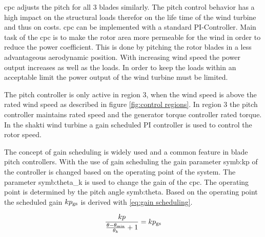 \gls{cpc} adjusts the pitch for all 3 blades similarly.
The pitch control behavior has a high impact on the structural loads therefor on the life time of the wind turbine and thus on costs.
\gls{cpc} can be implemented with a standard PI-Controller.
Main task of the \gls{cpc} is to make the rotor area more permeable for the wind in order to reduce the power coefficient.
This is done by pitching the rotor blades in a less advantageous aerodynamic position.
With increasing wind speed the power output increases as well as the loads.
In order to keep the loads within an acceptable limit the power output of the wind turbine must be limited.

The pitch controller is only active in region 3, when the wind speed is above the rated wind speed as described in figure \ref{fig:control regions}.
In region 3 the pitch controller maintains rated speed and the generator torque controller rated torque. \cite{SchlipfLecture}
In the \gls{shakti} wind turbine a gain scheduled PI controller is used to control the rotor speed. 

The concept of gain scheduling is widely used and a common feature in blade pitch controllers.
With the use of gain scheduling the gain parameter \gls{symb:kp} of the controller is changed based on the operating point of the system.
The parameter \gls{symb:theta_k} is used to change the gain of the \gls{cpc}.
The operating point is determined by the pitch angle \gls{symb:theta}. Based on the operating point the scheduled gain $kp_\textnormal{gs}$ is derived with \ref{eq:gain scheduling}.

\begin{equation}
	\frac{kp}{\frac{\theta - \theta_\textnormal{min}}{\theta_k} + 1} = kp_\textnormal{gs}
	\label{eq:gain scheduling}
\end{equation}



